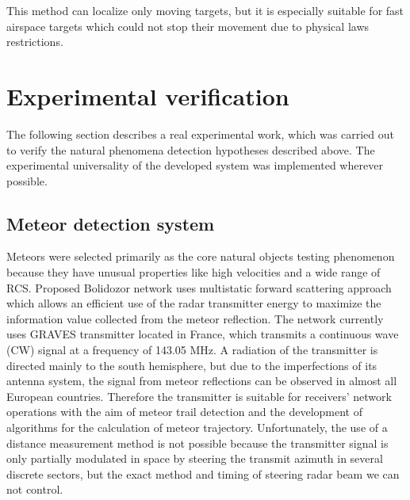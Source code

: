 \documentclass[twoside]{ctuthesis}
\theoremstyle{plain}
\theoremstyle{definition}
\theoremstyle{note}
\begin{document}
This method can localize only moving targets, but it is especially suitable for fast airspace targets which could not stop their movement due to physical laws restrictions. 

\chapter{Experimental verification}

The following section describes a real experimental work, which was carried out to verify the natural phenomena detection hypotheses described above. The experimental universality of the developed system was implemented wherever possible. 

\section{Meteor detection system}

Meteors were selected primarily as the core natural objects testing phenomenon because they have unusual properties like high velocities and a wide range of RCS.
Proposed Bolidozor network \cite{Bolidozor} uses multistatic forward scattering approach which allows an efficient use of the radar transmitter energy to maximize the information value collected from the meteor reflection.
The network currently uses GRAVES \cite{GRAVES_radar} transmitter located in France, which transmits a continuous wave (CW) signal at a frequency of 143.05 MHz. A radiation of the transmitter is directed mainly to the south hemisphere, but due to the imperfections of its antenna system, the signal from meteor reflections can be observed in almost all European countries. Therefore the transmitter is suitable for receivers' network operations with the aim of meteor trail detection and the development of algorithms for the calculation of meteor trajectory. Unfortunately, the use of a distance measurement method is not possible because the transmitter signal is only partially modulated in space by steering the transmit azimuth in several discrete sectors, but the exact method and timing of steering radar beam we can not control. 
\end{document}
